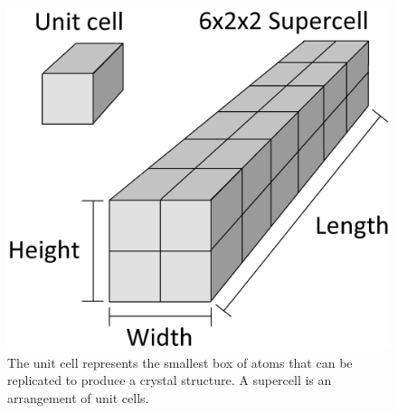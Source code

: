 \begin{figure}[h!]
  \includegraphics[width=\linewidth]{Figures/cell_diagram.png}
  \caption{The unit cell represents the smallest box of atoms that can be replicated to produce a crystal structure. A supercell is an arrangement of unit cells.}
  \label{fig:cell_dia}
\end{figure}

